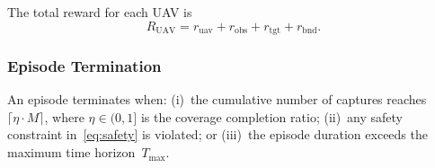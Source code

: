 The total reward for each UAV is
\begin{equation}
  R_{\mathrm{UAV}} = r_{\mathrm{uav}} + r_{\mathrm{obs}}
    + r_{\mathrm{tgt}} + r_{\mathrm{bnd}}.
  \label{eq:total_reward}
\end{equation}

\subsubsection{Episode Termination}
\label{subsubsec:termination}

An episode terminates when:
(i)~the cumulative number of captures reaches
$\lceil \eta \cdot M \rceil$, where $\eta \in (0,1]$ is the coverage
completion ratio;
(ii)~any safety constraint in~\eqref{eq:safety} is violated; or
(iii)~the episode duration exceeds the maximum time horizon~$T_{\max}$.

